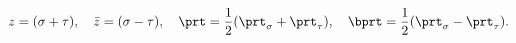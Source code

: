 \begin{equation}
z=(\sigma+\tau),\quad \bar z=(\sigma-\tau),\quad
\prt=\frac{1}{2}(\prt_\sigma+\prt_\tau),\quad
\bprt=\frac{1}{2}(\prt_\sigma-\prt_\tau).
\end{equation}

